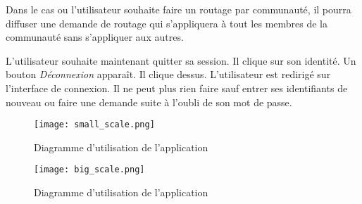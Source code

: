 Dans le cas ou l'utilisateur souhaite faire un routage par communauté, il pourra diffuser une demande de routage qui s'appliquera à tout les membres de la communauté sans s'appliquer aux autres.

L'utilisateur souhaite maintenant quitter sa session. Il clique sur son identité. Un bouton \textit{Déconnexion} apparaît. Il clique dessus. L'utilisateur est redirigé sur l'interface de connexion. Il ne peut plus rien faire sauf entrer ses identifiants de nouveau ou faire une demande suite à l'oubli de son mot de passe.


\begin{figure}[H]
    \texttt{[image: small\_scale.png]}
    \caption{Diagramme d'utilisation de l'application}
    \label{fig:use_cases}
\end{figure}

\begin{figure}[H]
    \texttt{[image: big\_scale.png]}
    \caption{Diagramme d'utilisation de l'application}
    \label{fig:use_cases}
\end{figure}




